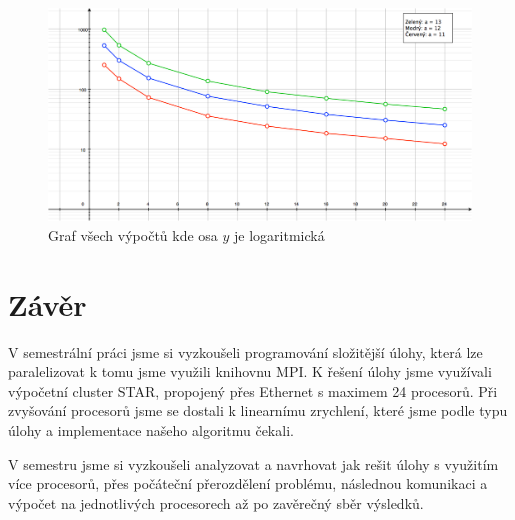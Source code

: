 \documentclass[12pt]{article}
\begin{document}
\begin{figure}[H]
  \centering
    \includegraphics[width=1\textwidth]{./graph1_log.png}
  \caption{Graf všech výpočtů kde osa $y$ je logaritmická}
  \label{fig:con}
\end{figure}

\newpage
\section{Závěr}

V semestrální práci jsme si vyzkoušeli programování složitější úlohy, která lze paralelizovat k tomu jsme využili knihovnu MPI. K řešení úlohy jsme využívali výpočetní cluster STAR, propojený přes Ethernet s maximem 24 procesorů. Při zvyšování procesorů jsme se dostali k linearnímu zrychlení, které jsme podle typu úlohy a implementace našeho algoritmu čekali. 

V semestru jsme si vyzkoušeli analyzovat a navrhovat jak rešit úlohy s využitím více procesorů, přes počáteční přerozdělení problému, následnou komunikaci a výpočet na jednotlivých procesorech až po zavěrečný sběr výsledků. 
\end{document}
